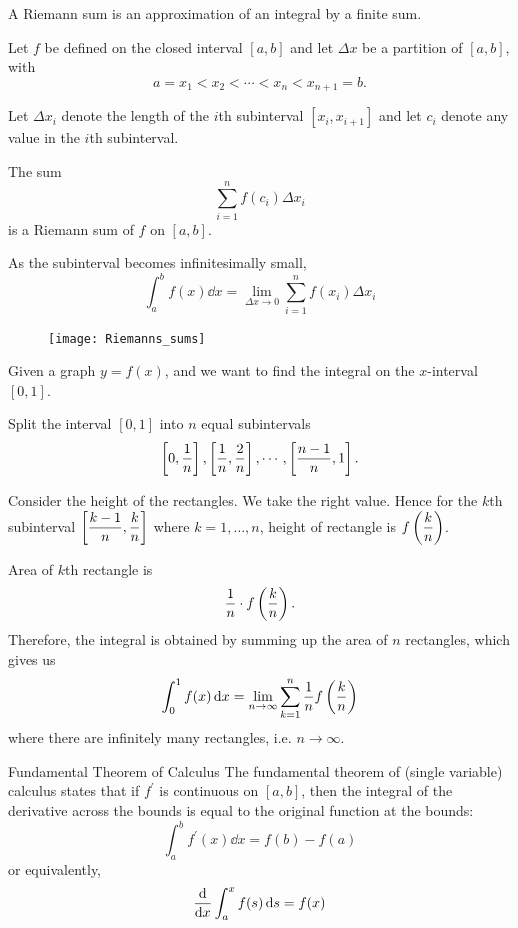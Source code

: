 A Riemann sum is an approximation of an integral by a finite sum.

Let $f$ be defined on the closed interval $[a,b]$ and let $\Delta x$ be a partition of $[a,b]$, with
\[ a=x_1 < x_2 < \cdots < x_n < x_{n+1}=b.\]

Let $\Delta x_i$ denote the length of the $i$th subinterval $[x_i,x_{i+1}]$ and let $c_i$ denote any value in the $i$th subinterval.

The sum
\[ \sum_{i=1}^n f(c_i)\Delta x_i\]
is a Riemann sum of $f$ on $[a,b]$.

As the subinterval becomes infinitesimally small, 
\begin{equation} \int _{a}^{b}f(x) \dd{x} = \lim _{\Delta x \to 0} \sum _{i=1}^{n} f(x_{i}) \Delta x_{i} \end{equation}

\begin{figure}[H]
	\centering
	\texttt{[image: Riemanns\_sums]}
\end{figure}

Given a graph $y=f(x)$, and we want to find the integral on the $x$-interval $[0,1]$.

Split the interval $[0,1]$ into $n$ equal subintervals 
\[\left[0, \frac{1}{n}\right], \left[\frac{1}{n}, \frac{2}{n}\right], \cdots, \left[\frac{n-1}{n}, 1\right].\]

Consider the height of the rectangles. We take the right value. Hence for the $k$th subinterval $\left[\dfrac{k-1}{n}, \dfrac{k}{n}\right]$ where $k=1,\dots,n$, height of rectangle is $f\left(\dfrac{k}{n}\right)$.

Area of $k$th rectangle is \[ \frac{1}{n} \cdot f\left(\frac{k}{n}\right).\]
Therefore, the integral is obtained by summing up the area of $n$ rectangles, which gives us
\begin{equation} \int_{0}^{1} f(x) \dd{x} = \lim_{n \to \infty} \sum_{k=1}^{n} \frac{1}{n} f\left(\frac{k}{n}\right) \end{equation}
where there are infinitely many rectangles, i.e. $n \to \infty$.

\begin{thrm}{Fundamental Theorem of Calculus}{}
The fundamental theorem of (single variable) calculus states that if $f^\prime$ is continuous on $[a,b]$, then the integral of the derivative across the bounds is equal to the original function at the bounds:
\begin{equation}
\int_a^b f^\prime(x) \dd{x} = f(b)-f(a)
\end{equation}
or equivalently,
\begin{equation}
\dv{x} \int_{a}^{x} f(s) \dd{s} = f(x)
\end{equation}
\end{thrm}

